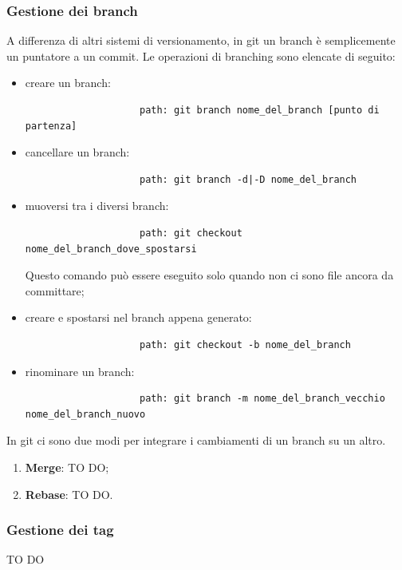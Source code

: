 		
		\subsubsection{Gestione dei branch} %
		\label{ssub:gestione_dei_branch_locale}
		A differenza di altri sistemi di versionamento, in git un branch è semplicemente un puntatore a un commit. \newline
		Le operazioni di branching sono elencate di seguito:
			\begin{itemize}
				\item creare un branch:
					\begin{verbatim}
					path: git branch nome_del_branch [punto di partenza]
					\end{verbatim}
				\item cancellare un branch:
					\begin{verbatim}
					path: git branch -d|-D nome_del_branch
					\end{verbatim}
				\item muoversi tra i diversi branch:
					\begin{verbatim}
					path: git checkout nome_del_branch_dove_spostarsi
					\end{verbatim}
				Questo comando può essere eseguito solo quando non ci sono file ancora da committare;
				\item creare e spostarsi nel branch appena generato:
					\begin{verbatim}
					path: git checkout -b nome_del_branch
					\end{verbatim}
				\item rinominare un branch:
					\begin{verbatim}
					path: git branch -m nome_del_branch_vecchio nome_del_branch_nuovo
					\end{verbatim}
			\end{itemize}
			\noindent
		
		In git ci sono due modi per integrare i cambiamenti di un branch su un altro.
			\begin{enumerate}
				\item \textbf{Merge}: TO DO;
				
				
				\item \textbf{Rebase}: TO DO.
			\end{enumerate}


		\subsubsection{Gestione dei tag} %
		\label{ssub:gestione_dei_tag_locale}
		TO DO
		
